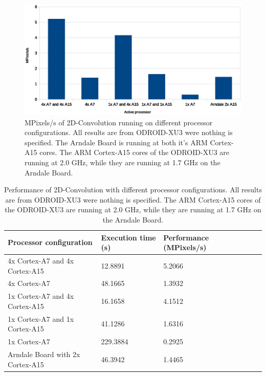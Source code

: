 \begin{figure}[H]
  \centering
  \includegraphics[width=160mm]{fig/mpixelss-configurations.eps}
  \caption{MPixels/s of 2D-Convolution running on different processor configurations. All results are from ODROID-XU3 were nothing is specified. The Arndale Board is running at both it's ARM Cortex-A15 cores. The ARM Cortex-A15 cores of the ODROID-XU3 are running at 2.0 GHz, while they are running at 1.7 GHz on the Arndale Board. \label{overflow}}
\end{figure}

\begin{table}[H]
  \begin{tabular}{llllll}
    \toprule
    Processor configuration           & Execution time (s)  & Performance (MPixels/s) \\
    \midrule
    4x Cortex-A7 and 4x Cortex-A15    & 12.8891             & 5.2066\\
    4x Cortex-A7                      & 48.1665             & 1.3932\\
    1x Cortex-A7 and 4x Cortex-A15    & 16.1658             & 4.1512\\
    1x Cortex-A7 and 1x Cortex-A15    & 41.1286             & 1.6316\\
    1x Cortex-A7                      & 229.3884            & 0.2925\\
    Arndale Board with 2x Cortex-A15    & 46.3942             & 1.4465\\
    \bottomrule
  \end{tabular}
  \caption{Performance of 2D-Convolution with different processor configurations. All results are from ODROID-XU3 were nothing is specified. The ARM Cortex-A15 cores of the ODROID-XU3 are running at 2.0 GHz, while they are running at 1.7 GHz on the Arndale Board. \label{overflow}}
\end{table}

